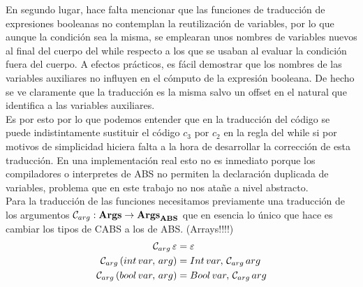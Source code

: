 En segundo lugar, hace falta mencionar que las funciones de traducción de expresiones booleanas no contemplan la reutilización de variables, por lo que aunque la condición sea la misma, se emplearan unos nombres de variables nuevos al final del cuerpo del while respecto a los que se usaban al evaluar la condición fuera del cuerpo. A efectos prácticos, es fácil demostrar que los nombres de las variables auxiliares no influyen en el cómputo de la expresión booleana. De hecho se ve claramente que la traducción es la misma salvo un offset en el natural que identifica a las variables auxiliares.\\

Es por esto por lo que podemos entender que en la traducción del código se puede indistintamente sustituir el código $c_3$ por $c_2$ en la regla del while si por motivos de simplicidad hiciera falta a la hora de desarrollar la corrección de esta traducción. En una implementación real esto no es inmediato porque los compiladores o interpretes de ABS no permiten la declaración duplicada de variables, problema que en este trabajo no nos atañe a nivel abstracto.\\

Para la traducción de las funciones necesitamos previamente una traducción de los argumentos $\mathcal{C}_{arg}: \textbf{Args} \rightarrow \textbf{Args}_{\textbf{ABS}}$ que en esencia lo único que hace es cambiar los tipos de CABS a los de ABS. (Arrays!!!!)
\begin{align*}
  \mathcal{C}_{arg}\,\varepsilon &= \varepsilon\\
  \mathcal{C}_{arg}\, (int \, var,\,arg) &= Int\,var,\,\mathcal{C}_{arg}\, arg\\
  \mathcal{C}_{arg}\, (bool \, var,\,arg) &= Bool\,var,\,\mathcal{C}_{arg}\, arg
\end{align*}

